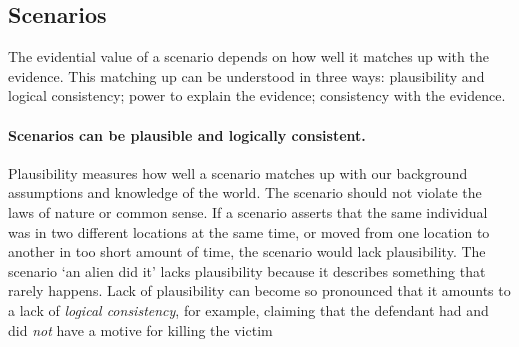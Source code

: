 \documentclass[10pt]{article}
\begin{document}

\subsection{Scenarios}

The evidential value of a scenario depends on how well it matches up with the evidence. 
This matching up can be understood in three ways: plausibility and logical consistency; power to explain the evidence; 
consistency with the evidence. 


\paragraph{Scenarios can be plausible and logically consistent.}

Plausibility measures how well a scenario matches up with 
our background assumptions and knowledge of the world. %
The scenario should not violate the laws of nature or common sense. If a scenario asserts that the same individual was in two different locations 
at the same time, or moved from one location to another in too short amount of time, the scenario would lack plausibility.  
The scenario `an alien did it' lacks plausibility because it describes something that rarely happens. 
Lack of plausibility can become so pronounced that it amounts to a lack of \textit{logical consistency}, for example, claiming that 
 the defendant had and did \textit{not} have a motive for killing the victim
 
\end{document}
